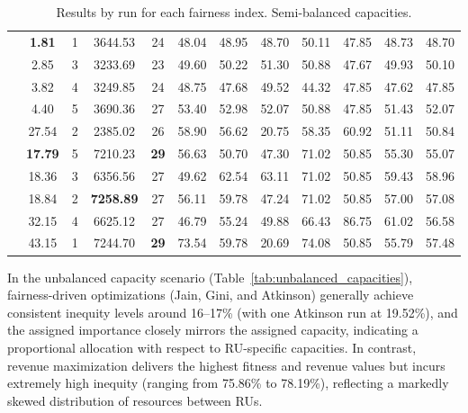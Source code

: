 \documentclass[preprint,12pt]{elsarticle}
\begin{document}
\begin{table}[htbp]
\begin{adjustbox}{max width=\textwidth}
\begin{tabular}{|c|c|c|c|c|c|c|c|c|c|c|c|}
\parbox[t]{2mm}{} & \textbf{1.81} & 1 & 3644.53 & 24 & 48.04 & 48.95 & 48.70 & 50.11 & 47.85 & 48.73 & 48.70 \\
& 2.85 & 3 & 3233.69 & 23 & 49.60 & 50.22 & 51.30 & 50.88 & 47.67 & 49.93 & 50.10 \\
& 3.82 & 4 & 3249.85 & 24 & 48.75 & 47.68 & 49.52 & 44.32 & 47.85 & 47.62 & 47.85 \\
& 4.40 & 5 & 3690.36 & 27 & 53.40 & 52.98 & 52.07 & 50.88 & 47.85 & 51.43 & 52.07 \\
& 27.54 & 2 & 2385.02 & 26 & 58.90 & 56.62 & 20.75 & 58.35 & 60.92 & 51.11 & 50.84 \\ \hline

\parbox[t]{2mm}{} & \textbf{17.79} & 5 & 7210.23 & \textbf{29} & 56.63 & 50.70 & 47.30 & 71.02 & 50.85 & 55.30 & 55.07 \\
& 18.36 & 3 & 6356.56 & 27 & 49.62 & 62.54 & 63.11 & 71.02 & 50.85 & 59.43 & 58.96 \\
& 18.84 & 2 & \textbf{7258.89} & 27 & 56.11 & 59.78 & 47.24 & 71.02 & 50.85 & 57.00 & 57.08 \\
& 32.15 & 4 & 6625.12 & 27 & 46.79 & 55.24 & 49.88 & 66.43 & 86.75 & 61.02 & 56.58 \\
& 43.15 & 1 & 7244.70 & \textbf{29} & 73.54 & 59.78 & 20.69 & 74.08 & 50.85 & 55.79 & 57.48 \\ \hline
\end{tabular}
\end{adjustbox}
\caption{Results by run for each fairness index. Semi-balanced capacities.}
\label{tab:semi_balanced_capacities}
\end{table}

In the unbalanced capacity scenario (Table~\ref{tab:unbalanced_capacities}), fairness-driven optimizations (Jain, Gini, and Atkinson) generally achieve consistent inequity levels around 16–17\% (with one Atkinson run at 19.52\%), and the assigned importance closely mirrors the assigned capacity, indicating a proportional allocation with respect to RU-specific capacities. In contrast, revenue maximization delivers the highest fitness and revenue values but incurs extremely high inequity (ranging from 75.86\% to 78.19\%), reflecting a markedly skewed distribution of resources between RUs. 
\end{document}

